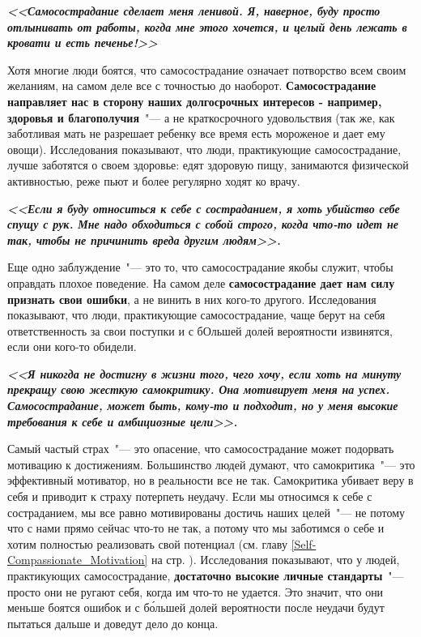 \vspace{4ex}

\textbf{\textit{<<Самосострадание сделает меня ленивой. Я, наверное, буду просто отлынивать от работы, когда мне этого хочется, и целый день лежать в кровати и есть печенье!>>}}

\vspace{2ex}

Хотя многие люди боятся, что самосострадание означает потворство всем своим желаниям, на самом деле все с точностью до наоборот. \textbf{Самосострадание направляет нас в сторону наших долгосрочных интересов - например, здоровья и благополучия}~"--- а не краткосрочного удовольствия (так же, как заботливая мать не разрешает ребенку все время есть мороженое и дает ему овощи).  Исследования показывают, что люди, практикующие самосострадание, лучше заботятся о своем здоровье: едят здоровую пищу, занимаются физической активностью, реже пьют и более регулярно ходят ко врачу. 

\vspace{4ex}

\textbf{\textit{<<Если я буду относиться к себе с состраданием, я хоть убийство себе спущу с рук. Мне надо обходиться с собой строго, когда что-то идет не так, чтобы не причинить вреда другим людям>>.}}

\vspace{2ex}

Еще одно заблуждение~"--- это то, что самосострадание якобы служит, чтобы оправдать плохое поведение. На самом деле \textbf{самосострадание дает нам силу признать свои ошибки}, а не винить в них кого-то другого. Исследования показывают, что люди, практикующие самосострадание, чаще берут на себя ответственность за свои поступки и с бОльшей долей вероятности извинятся, если они кого-то обидели. 

\vspace{4ex}
\textbf{\textit{
<<Я никогда не достигну в жизни того, чего хочу, если хоть на минуту прекращу свою жесткую самокритику. Она мотивирует меня на успех. Самосострадание, может быть, кому-то и подходит, но у меня высокие требования к себе и амбициозные цели>>.}}

\vspace{2ex}
 
Самый частый страх~"--- это опасение, что самосострадание может подорвать мотивацию к достижениям. Большинство людей думают, что самокритика~"--- это эффективный мотиватор, но в реальности все не так. Самокритика убивает веру в себя и приводит к страху потерпеть неудачу. Если мы относимся к себе с состраданием, мы все равно мотивированы достичь наших целей~"--- не потому что с нами прямо сейчас что-то не так, а потому что мы заботимся о себе и хотим полностью реализовать свой потенциал (см. главу \ref{Self-Compassionate_Motivation} на стр. \pageref{Self-Compassionate_Motivation}). Исследования показывают, что у людей, практикующих самосострадание, \textbf{достаточно высокие личные стандарты}~"--- просто они не ругают себя, когда им что-то не удается. Это значит, что они меньше боятся ошибок и с б\'{о}льшей долей вероятности после неудачи будут пытаться дальше и доведут дело до конца. 

